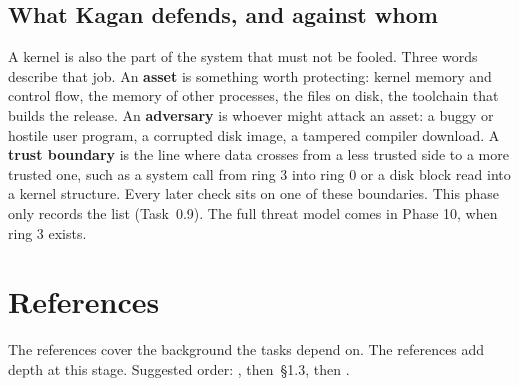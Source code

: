 \documentclass[11pt,a4paper]{article}
\begin{document}
\subsection{What Kagan defends, and against whom}

A kernel is also the part of the system that must not be fooled. Three words describe that job. An \textbf{asset} is
something worth protecting: kernel memory and control flow, the memory of other processes, the files on disk, the
toolchain that builds the release. An \textbf{adversary} is whoever might attack an asset: a buggy or hostile user
program, a corrupted disk image, a tampered compiler download. A \textbf{trust boundary} is the line where data
crosses from a less trusted side to a more trusted one, such as a system call from ring 3 into ring 0 or a disk
block read into a kernel structure. Every later check sits on one of these boundaries. This phase only records the
list (Task~0.9). The full threat model comes in Phase 10, when ring 3 exists.

\section{References}

The \must references cover the background the tasks depend on. The \should references add depth at this stage.
Suggested order: \OSTEP, then \MOS\,\S1.3, then \LOB.
\end{document}
